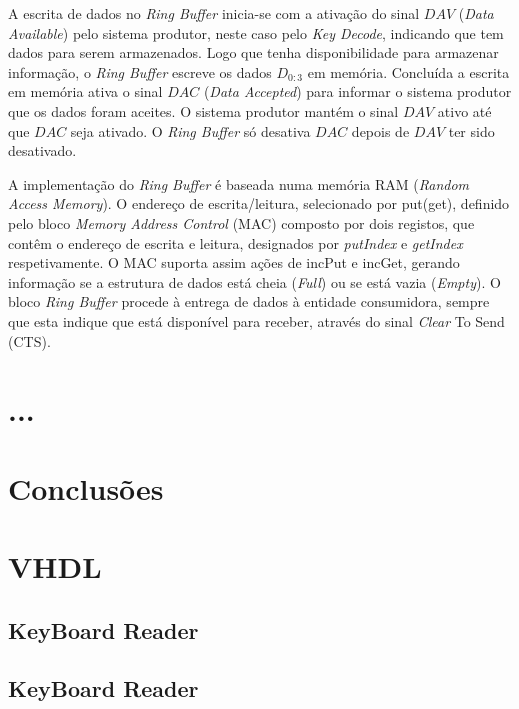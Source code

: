 \documentclass[10pt,a4paper,twocolumn]{article}
\begin{document}
A escrita de dados no \textit{Ring Buffer} inicia-se com a ativação do sinal $DAV$ (\textit{Data Available}) pelo sistema produtor, neste caso pelo \textit{Key Decode}, indicando que tem dados para serem armazenados. 
Logo que tenha disponibilidade para armazenar informação, o \textit{Ring Buffer }escreve os dados $D_{0:3}$ em memória. 
Concluída a escrita em memória ativa o sinal $DAC$ (\textit{Data Accepted}) para informar o sistema produtor que os dados foram aceites. O sistema produtor mantém o sinal $DAV$ ativo até que $DAC$ seja ativado. 
O \textit{Ring Buffer} só desativa $DAC$ depois de $DAV$ ter sido desativado.

A implementação do \textit{Ring Buffer} é baseada numa memória RAM (\textit{Random Access Memory}). 
O endereço de escrita/leitura, selecionado por put(get), definido pelo bloco \textit{Memory Address Control }(MAC) composto por dois registos, que contêm o endereço de escrita e leitura, designados por \textit{putIndex} e \textit{getIndex} respetivamente. 
O MAC suporta assim ações de incPut e incGet, gerando informação se a estrutura de dados está cheia (\textit{Full}) ou se está vazia (\textit{Empty}). 
O bloco \textit{Ring Buffer }procede à entrega de dados à entidade consumidora, sempre que esta indique que está disponível para receber, através do sinal \textit{Clear} To Send (CTS). 

\section{...}

\section{Conclusões}

\onecolumn
\clearpage
\appendix
\section{VHDL}
\subsection{KeyBoard Reader}
\label{sec:keyboardReader_VHDL}

\subsection{KeyBoard Reader}
\label{sec:keyboardReader_VHDL}
\begin{minipage}{\linewidth}
\footnotesize
\inputminted{vhdl}{vhdl/ficheiro1.vhd}
\label{vhdl:fichiero1}
\end{minipage}
\end{document}
